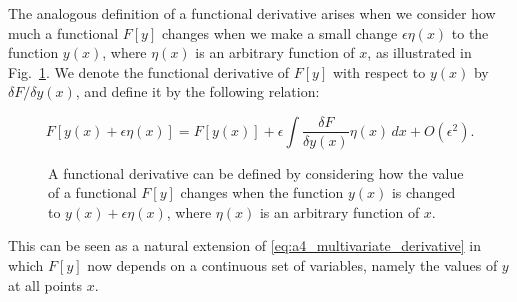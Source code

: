 \documentclass[10pt,twocolumn]{memoir}
\begin{document}
The analogous definition of a functional derivative arises when we consider how much a functional $F[y]$ changes when we make a small change $\epsilon\eta(x)$ to the function $y(x)$, where $\eta(x)$ is an arbitrary function of $x$, as illustrated in Fig.~\ref{fig:functional_derivative}. We denote the functional derivative of $F[y]$ with respect to $y(x)$ by $\delta F/\delta y(x)$, and define it by the following relation:

\begin{equation}
    F[y(x) + \epsilon \eta(x)] = F[y(x)] + \epsilon\int\frac{\delta F}{\delta y(x)}\eta(x)\,dx + O(\epsilon^2).
\label{eq:a4_functional_derivative}
\end{equation}

\begin{figure}[t]
    \centering

    \caption{A functional derivative can be defined by considering how the
    value of a functional $F[y]$ changes when the function $y(x)$ is changed
    to $y(x)+\epsilon\eta(x)$, where $\eta(x)$ is an arbitrary function of $x$.}
\label{fig:functional_derivative}
\end{figure}

This can be seen as a natural extension of \ref{eq:a4_multivariate_derivative} in which $F[y]$ now depends on a continuous set of variables, namely the values of $y$ at all points $x$.
\end{document}
